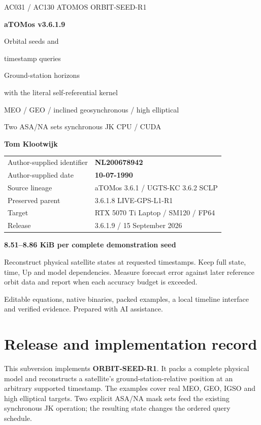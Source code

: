 \documentclass[11pt,a4paper]{article}
\begin{document}
\begin{titlepage}\thispagestyle{empty}
{\sffamily\color{accent}\large AC031 / AC130 ATOMOS \hfill ORBIT-SEED-R1}\par
\vspace{18mm}
{\sffamily\bfseries\fontsize{51}{58}\selectfont\color{ink}aTOMos v3.6.1.9}\par
\vspace{10mm}
{\sffamily\fontsize{28}{34}\selectfont Orbital seeds and\par timestamp queries}\par
\vspace{7mm}
{\sffamily\fontsize{21}{27}\selectfont\color{gold}Ground-station horizons\par with the literal self-referential kernel}\par
\vspace{12mm}
{\large MEO / GEO / inclined geosynchronous / high elliptical\par
Two ASA/NA sets \;\textperiodcentered\; synchronous JK \;\textperiodcentered\; CPU / CUDA}\par
\vspace{16mm}
{\sffamily\bfseries\Large Tom Klootwijk}\par
\begin{tabular}{@{}ll@{}}
Author-supplied identifier & \textbf{NL200678942}\\
Author-supplied date & \textbf{10-07-1990}\\
Source lineage & aTOMos 3.6.1 / UGTS-KC 3.6.2 SCLP\\
Preserved parent & 3.6.1.8 LIVE-GPS-L1-R1\\
Target & RTX 5070 Ti Laptop / SM120 / FP64\\
Release & 3.6.1.9 / 15 September 2026\\
\end{tabular}
\vfill
\begin{panel}
\textbf{8.51--8.86 KiB per complete demonstration seed}\par
Reconstruct physical satellite states at requested timestamps. Keep full state,
time, Up and model dependencies. Measure forecast error against later reference
orbit data and report when each accuracy budget is exceeded.
\end{panel}
{\small\color{muted}Editable equations, native binaries, packed examples, a local
timeline interface and verified evidence. Prepared with AI assistance.}
\end{titlepage}
\setcounter{page}{2}
\section*{Release and implementation record}
This subversion implements \textbf{ORBIT-SEED-R1}. It packs a complete physical
model and reconstructs a satellite's ground-station-relative position at an
arbitrary supported timestamp. The examples cover real MEO, GEO, IGSO and high
elliptical targets. Two explicit ASA/NA mask sets feed the existing synchronous
JK operation; the resulting state changes the ordered query schedule.
\end{document}
